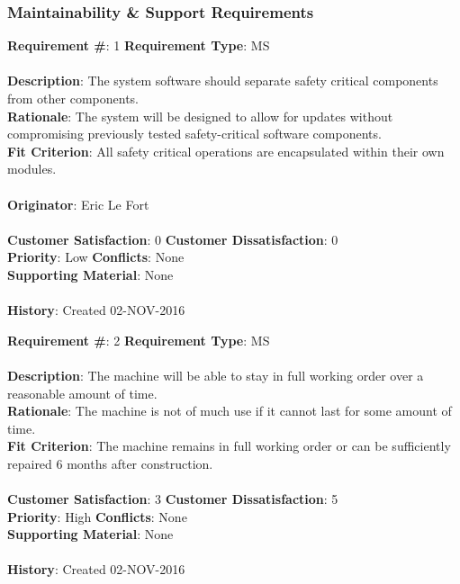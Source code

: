 \documentclass[titlepage]{article}
\begin{document}
\subsubsection{Maintainability \& Support Requirements}
\begin{framed}
	\noindent\textbf{Requirement \#}: 1 \hfill \textbf{Requirement Type}: MS \hfill\\\\
	\noindent\textbf{Description}: The system software should separate safety critical components from other components.\\
	\textbf{Rationale}: The system will be designed to allow for updates without compromising previously tested safety-critical software components.\\
	\textbf{Fit Criterion}: All safety critical operations are encapsulated within their own modules.\\\\
	\textbf{Originator}: Eric Le Fort\\\\
	\noindent\textbf{Customer Satisfaction}: 0 \hfill 	\textbf{Customer Dissatisfaction}: 0\hfill\\
	\textbf{Priority}: Low \hfill \textbf{Conflicts}: None\hfill\\
	\textbf{Supporting Material}: None\\\\
	\noindent\textbf{History}: Created 02-NOV-2016
\end{framed}

\begin{framed}
	\noindent\textbf{Requirement \#}: 2 \hfill \textbf{Requirement Type}: MS \hfill\\\\
	\noindent\textbf{Description}: The machine will be able to stay in full working order over a reasonable amount of time.\\
	\textbf{Rationale}: The machine is not of much use if it cannot last for some amount of time.\\
	\textbf{Fit Criterion}: The machine remains in full working order or can be sufficiently repaired 6 months after construction.\\\\
	\noindent\textbf{Customer Satisfaction}: 3 \hfill 	\textbf{Customer Dissatisfaction}: 5\hfill\\
	\textbf{Priority}: High \hfill \textbf{Conflicts}: None\hfill\\
	\textbf{Supporting Material}: None\\\\
	\noindent\textbf{History}: Created 02-NOV-2016
\end{framed}
\newpage
\end{document}
